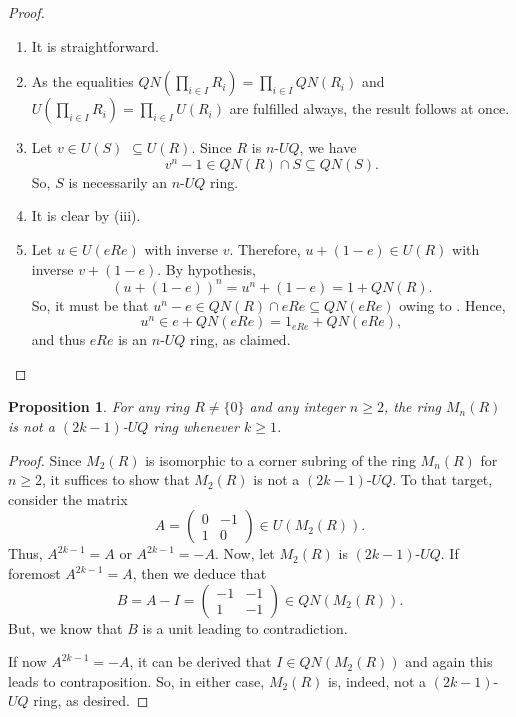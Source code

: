 \documentclass[10pt,a4paper]{amsart}
\newtheorem{proposition}[theorem]{Proposition}
\begin{document}
\begin{proof}
\begin{enumerate}
\item
It is straightforward.
\item
As the equalities \(QN(\prod_{i \in I} R_i) = \prod_{i \in I} QN(R_i)\) and \(U(\prod_{i \in I} R_i) = \prod_{i \in I} U(R_i)\) are fulfilled always, the result follows at once.
\item
Let \(v \in U(S)\) \(\subseteq U(R)\). Since \(R\) is $n$-$UQ$, we have \[ v^n-1 \in QN(R) \cap S \subseteq QN(S).\] So, \(S\) is necessarily an $n$-$UQ$ ring.
\item
It is clear by (iii).
\item
Let $u \in U(eRe)$ with inverse $v$. Therefore, $u + (1 - e) \in U(R)$ with inverse $v + (1 - e)$. By hypothesis, $$(u + (1-e))^n = u^n + (1 - e) = 1 + QN(R).$$ So, it must be that $u^n - e \in QN(R)\cap eRe\subseteq QN(eRe)$ owing to \cite[Lemma 3.5]{chen2012}. Hence, $$u^n \in e + QN(eRe) = 1_{eRe} + QN(eRe),$$ and thus $eRe$ is an $n$-$UQ$ ring, as claimed.
\end{enumerate}
\end{proof}

\begin{proposition}\label{2.10}
For any ring \( R \neq \{0\} \) and any integer \( n \geq 2 \), the ring \( M_n(R) \) is not a $(2k-1)$-$UQ$ ring whenever $k\geq 1$.
\end{proposition}

\begin{proof}
Since \( M_2(R) \) is isomorphic to a corner subring of the ring \( M_n(R) \) for \( n \geq 2 \), it suffices to show that \( M_2(R) \) is not a $(2k-1)$-$UQ$. To that target, consider the matrix
\[
A = \begin{pmatrix} 0 & -1 \\ 1 & 0 \end{pmatrix} \in U(M_2(R)).
\]
Thus, $A^{2k-1}=A$ or $A^{2k-1}=-A$. Now, let $M_2(R)$ is $(2k-1)$-$UQ$. If foremost $A^{2k-1}=A$, then we deduce that
\[
B=A-I=\begin{pmatrix} -1 & -1 \\ 1 & -1 \end{pmatrix}\in QN(M_2(R)).
\]
But, we know that $B$ is a unit leading to contradiction.

If now $A^{2k-1}=-A$, it can be derived that $I\in QN(M_2(R))$ and again this leads to contraposition. So, in either case, \( M_2(R) \) is, indeed, not a $(2k-1)$-$UQ$ ring, as desired.
\end{proof}
\end{document}
